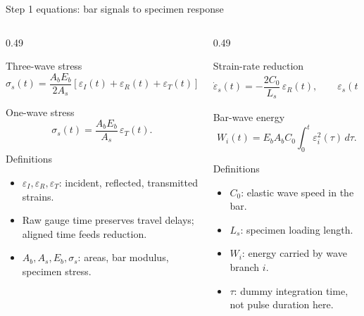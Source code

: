 \documentclass[11pt,aspectratio=169]{beamer}
\begin{document}
\begin{frame}[shrink=5]{Step 1 equations: bar signals to specimen response}
  \scriptsize
  \begin{columns}[T,onlytextwidth]
    \begin{column}{0.49\textwidth}
      \begin{block}{Three-wave stress}
        \[
          \sigma_s(t)=
          \frac{A_bE_b}{2A_s}
          \left[\varepsilon_I(t)+\varepsilon_R(t)+\varepsilon_T(t)\right].
        \]
      \end{block}
      \begin{block}{One-wave stress}
        \[
          \sigma_s(t)=\frac{A_bE_b}{A_s}\,\varepsilon_T(t).
        \]
      \end{block}
      \begin{block}{Definitions}
        \begin{itemize}
          \item $\varepsilon_I,\varepsilon_R,\varepsilon_T$: incident, reflected, transmitted strains.
          \item Raw gauge time preserves travel delays; aligned time feeds reduction.
          \item $A_b,A_s,E_b,\sigma_s$: areas, bar modulus, specimen stress.
        \end{itemize}
      \end{block}
    \end{column}
    \begin{column}{0.49\textwidth}
      \begin{exampleblock}{Strain-rate reduction}
        \[
          \dot{\varepsilon}_s(t)=
          -\frac{2C_0}{L_s}\,\varepsilon_R(t),
          \qquad
          \varepsilon_s(t)=\int_0^t \dot{\varepsilon}_s(\tau)\,d\tau .
        \]
      \end{exampleblock}
      \begin{block}{Bar-wave energy}
        \[
          W_i(t)=E_bA_bC_0
          \int_0^t \varepsilon_i^2(\tau)\,d\tau .
        \]
      \end{block}
      \begin{block}{Definitions}
        \begin{itemize}
          \item $C_0$: elastic wave speed in the bar.
          \item $L_s$: specimen loading length.
          \item $W_i$: energy carried by wave branch $i$.
          \item $\tau$: dummy integration time, not pulse duration here.
        \end{itemize}
      \end{block}
    \end{column}
  \end{columns}
\end{frame}
\end{document}
